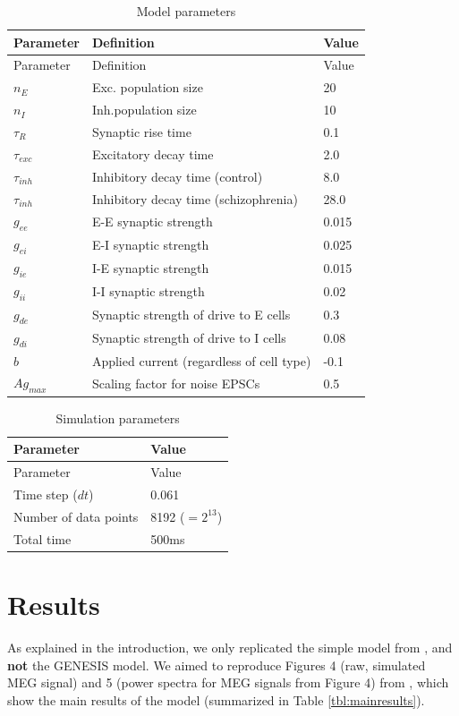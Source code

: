 \documentclass[10pt,a4paper,onecolumn]{article}
\begin{document}
\begin{longtable}[]{@{}lll@{}}
\caption{Model parameters} \label{tbl:modparameters}\tabularnewline
\toprule
Parameter & Definition & Value\tabularnewline
\midrule
\endfirsthead
\toprule
Parameter & Definition & Value\tabularnewline
\midrule
\endhead
\(n_E\) & Exc. population size & 20\tabularnewline
\(n_I\) & Inh.population size & 10\tabularnewline
\(\tau_R\) & Synaptic rise time & 0.1\tabularnewline
\(\tau_{exc}\) & Excitatory decay time & 2.0\tabularnewline
\(\tau_{inh}\) & Inhibitory decay time (control) & 8.0\tabularnewline
\(\tau_{inh}\) & Inhibitory decay time (schizophrenia) &
28.0\tabularnewline
\(g_{ee}\) & E-E synaptic strength & 0.015\tabularnewline
\(g_{ei}\) & E-I synaptic strength & 0.025\tabularnewline
\(g_{ie}\) & I-E synaptic strength & 0.015\tabularnewline
\(g_{ii}\) & I-I synaptic strength & 0.02\tabularnewline
\(g_{de}\) & Synaptic strength of drive to E cells & 0.3\tabularnewline
\(g_{di}\) & Synaptic strength of drive to I cells & 0.08\tabularnewline
\(b\) & Applied current (regardless of cell type) & -0.1\tabularnewline
\(Ag_{max}\) & Scaling factor for noise EPSCs & 0.5\tabularnewline
\bottomrule
\end{longtable}

\begin{longtable}[]{@{}ll@{}}
\caption{Simulation parameters }\label{tbl:simparameters}\tabularnewline
\toprule
Parameter & Value\tabularnewline
\midrule
\endfirsthead
\toprule
Parameter & Value\tabularnewline
\midrule
\endhead
Time step (\(dt\)) & 0.061\tabularnewline
Number of data points & 8192 (\(=2^{13}\))\tabularnewline
Total time & 500ms\tabularnewline
\bottomrule
\end{longtable}

\section{Results}\label{results}

As explained in the introduction, we only replicated the simple model
from \autocite{Vierling2008}, and \textbf{not} the GENESIS model. We
aimed to reproduce Figures 4 (raw, simulated MEG signal) and 5 (power
spectra for MEG signals from Figure 4) from \autocite{Vierling2008},
which show the main results of the model (summarized in Table
\ref{tbl:mainresults}).
\end{document}
